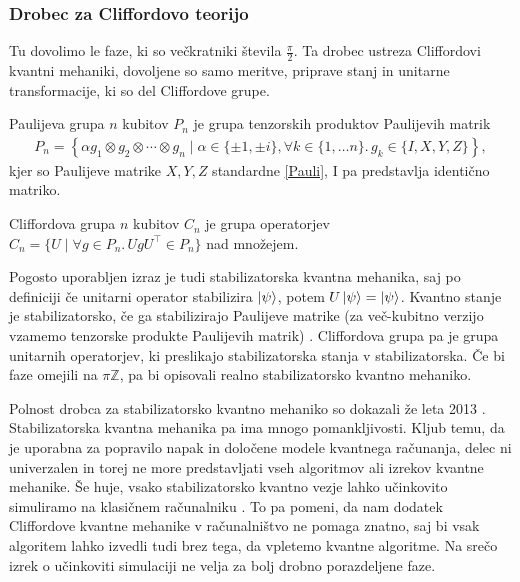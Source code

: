\documentclass[mat1]{fmfdelo}
\newcommand{\Z}{\mathbb Z}
\newcommand{\tranp}{\top}
\newcommand{\sep}{\ensuremath{.\,}}
\begin{document}
\subsubsection{Drobec za Cliffordovo teorijo}
Tu dovolimo le faze, ki so večkratniki števila \(\frac\pi2\). Ta drobec ustreza Cliffordovi kvantni mehaniki, dovoljene so samo meritve, priprave stanj in unitarne transformacije, ki so del Cliffordove grupe.
\begin{definicija}
    Paulijeva grupa \(n\) kubitov \(P_n\) je grupa tenzorskih produktov Paulijevih matrik
    \begin{align*}
        P_n = \left\{\alpha g_1\otimes g_2\otimes\cdots\otimes g_n \mid \alpha\in\{\pm 1, \pm i\}, \forall k\in\{1,\ldots n\}\sep g_k\in \{I,X,Y,Z\}\right\},
    \end{align*}
    kjer so Paulijeve matrike \(X,Y,Z\) standardne \ref{Pauli}, I pa predstavlja identično matriko.
\end{definicija}
\begin{definicija}
    Cliffordova grupa \(n\) kubitov \(C_n\) je grupa operatorjev \(C_n=\{U\mid \forall g\in P_n\sep UgU^\tranp\in P_n\}\) nad množejem.
\end{definicija}
Pogosto uporabljen izraz je tudi stabilizatorska kvantna mehanika, saj po definiciji če unitarni operator stabilizira \(\ket \psi\), potem \(U\ket\psi = \ket\psi\). Kvantno stanje je stabilizatorsko, če ga stabilizirajo Paulijeve matrike (za več-kubitno verzijo vzamemo tenzorske produkte Paulijevih matrik) \cite{Backens1}. Cliffordova grupa pa je grupa unitarnih operatorjev, ki preslikajo stabilizatorska stanja v stabilizatorska. Če bi faze omejili na \(\pi\Z\), pa bi opisovali realno stabilizatorsko kvantno mehaniko.

Polnost drobca za stabilizatorsko kvantno mehaniko so dokazali že leta 2013 \cite{Backens1}. Stabilizatorska kvantna mehanika pa ima mnogo pomankljivosti. Kljub temu, da je uporabna za popravilo napak in določene modele kvantnega računanja, delec ni univerzalen in torej ne more predstavljati vseh algoritmov ali izrekov kvantne mehanike. Še huje, vsako stabilizatorsko kvantno vezje lahko učinkovito simuliramo na klasičnem računalniku \cite{Aaronson_2004}. To pa pomeni, da nam dodatek Cliffordove kvantne mehanike v računalništvo ne pomaga znatno, saj bi vsak algoritem lahko izvedli tudi brez tega, da vpletemo kvantne algoritme. Na srečo izrek o učinkoviti simulaciji ne velja za bolj drobno porazdeljene faze.
\end{document}
